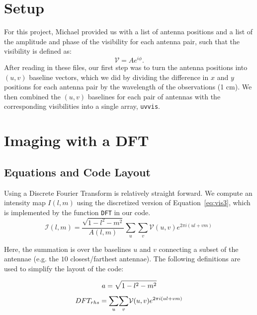 \documentclass[11pt,letterpaper]{article}
\begin{document}
\section{Setup}
For this project, Michael provided us with a list of antenna positions and a 
list of the amplitude and phase of the visibility for each antenna pair, such 
that the visibility is defined as:
\begin{equation}
\mathcal{V}=Ae^{i\phi}.
\end{equation}
After reading in these files, our first step was to turn the antenna positions 
into $(u,v)$ baseline vectors, which we did by dividing the difference in 
$x$ and $y$ positions for each antenna pair by the wavelength of the 
observations (1 cm).  We then combined the $(u,v)$ baselines for 
each pair of antennas with the corresponding visibilities into a 
single array, \texttt{uvvis}.

\section{Imaging with a DFT}

\subsection{Equations and Code Layout}
Using a Discrete Fourier Transform is relatively straight forward. We compute an intensity map $I(l,m)$ using the discretized version of Equation~\ref{eq:vis3}, which is implemented by the function \texttt{DFT} in our code.
\begin{equation}\label{eq:dft1}
\mathcal{I}(l,m)= \frac{\sqrt{1-l^2-m^2}}{A(l,m)}\displaystyle\sum\limits_{u}  \! \displaystyle\sum\limits_{v} \! \mathcal{V}(u,v)e^{2\pi i(ul+vm)} \,
\end{equation}

Here, the summation is over the baselines $u$ and $v$ connecting a subset of the antennae (e.g. the $10$ closest/farthest antennae). The following definitions are used to simplify the layout of the code:

\begin{equation}\label{eq:a}
a = \sqrt{1-l^2-m^2} \\
\end{equation}
\begin{equation}\label{eq:rhs}
DFT_{rhs} = \displaystyle\sum\limits_{u}  \! \displaystyle\sum\limits_{v} \! \mathcal{V}(u,v)e^{2\pi i(ul+vm)}\\
\end{equation}
\end{document}
